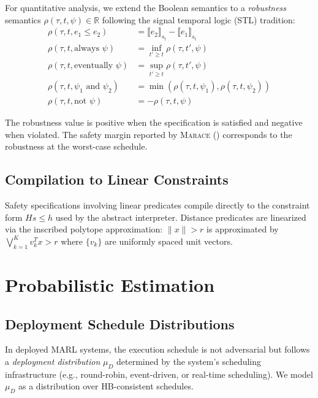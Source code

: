\documentclass[11pt]{article}
\newcommand{\R}{\mathbb{R}}
\newcommand{\norm}[1]{\lVert #1 \rVert}
\newcommand{\marace}{\textsc{Marace}}
\begin{document}
For quantitative analysis, we extend the Boolean semantics to a
\emph{robustness} semantics $\rho(\tau, t, \psi) \in \R$ following
the signal temporal logic (STL) tradition:
\begin{align}
  \rho(\tau, t, e_1 \leq e_2) &= \llbracket e_2 \rrbracket_{s_t} - \llbracket e_1 \rrbracket_{s_t} \\
  \rho(\tau, t, \text{always } \psi) &= \inf_{t' \geq t} \rho(\tau, t', \psi) \\
  \rho(\tau, t, \text{eventually } \psi) &= \sup_{t' \geq t} \rho(\tau, t', \psi) \\
  \rho(\tau, t, \psi_1 \text{ and } \psi_2) &= \min(\rho(\tau, t, \psi_1), \rho(\tau, t, \psi_2)) \\
  \rho(\tau, t, \text{not } \psi) &= -\rho(\tau, t, \psi)
\end{align}

The robustness value is positive when the specification is satisfied and negative
when violated. The safety margin reported by \marace{} ()
corresponds to the robustness at the worst-case schedule.

\subsection{Compilation to Linear Constraints}

Safety specifications involving linear predicates compile directly to
the constraint form $Hs \leq h$ used by the abstract interpreter.
Distance predicates are linearized via the inscribed polytope
approximation: $\norm{x} > r$ is approximated by
$\bigvee_{k=1}^{K} v_k^T x > r$ where $\{v_k\}$ are uniformly spaced
unit vectors.

\section{Probabilistic Estimation}
\label{app:prob}

\subsection{Deployment Schedule Distributions}

In deployed MARL systems, the execution schedule is not adversarial but
follows a \emph{deployment distribution} $\mu_D$ determined by the
system's scheduling infrastructure (e.g., round-robin, event-driven,
or real-time scheduling). We model $\mu_D$ as a distribution over
HB-consistent schedules.
\end{document}
